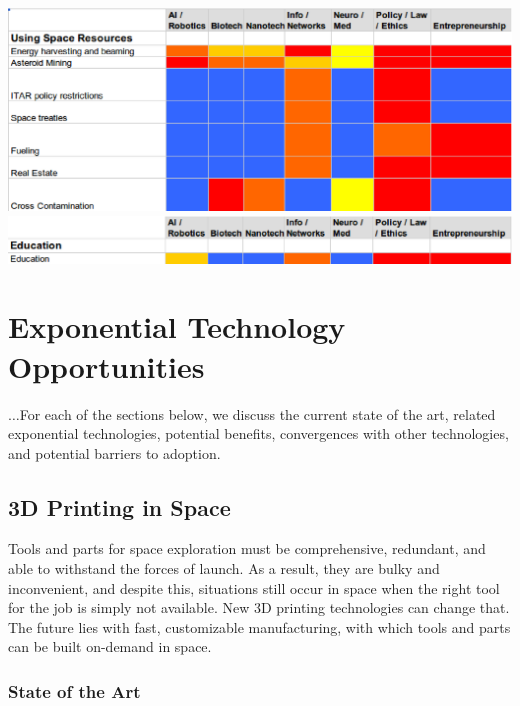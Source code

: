 \documentclass[letter,11pt]{article}
\begin{document}
\includegraphics[width=\textwidth]{hm_usr}
\includegraphics[width=\textwidth]{hm_e}

\section{Exponential Technology Opportunities}

$\ldots$For each of the sections below, we discuss the current state of the art,
related exponential technologies, potential benefits, convergences with other
technologies, and potential barriers to adoption.

\secttoc

\subsection{3D Printing in Space}

Tools and parts for space exploration must be comprehensive, redundant,
and able to withstand the forces of launch. As a result, they are bulky
and inconvenient, and despite this, situations still occur in space when
the right tool for the job is simply not available. New 3D printing
technologies can change that. The future lies with fast, customizable
manufacturing, with which tools and parts can be built on-demand in space.

\subsubsection{State of the Art}
\end{document}
